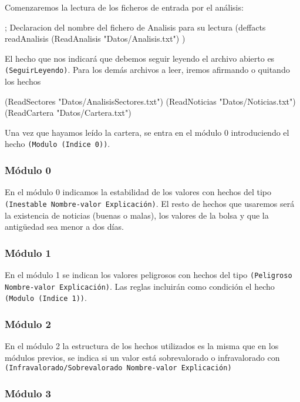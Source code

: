 \documentclass[11pt,leqno]{article}
\theoremstyle{definition_wo_parentheses}
\theoremstyle{plain}
\theoremstyle{remark}
\begin{document}
Comenzaremos la lectura de los ficheros de entrada por el análisis: 

\begin{clips-code}
; Declaracion del nombre del fichero de Analisis para su lectura
(deffacts readAnalisis
  (ReadAnalisis "Datos/Analisis.txt")
)
\end{clips-code}

El hecho que nos indicará que debemos seguir leyendo el archivo abierto es \texttt{(SeguirLeyendo)}. Para los demás archivos a leer, iremos afirmando o quitando los hechos

\begin{clips-code}
(ReadSectores "Datos/AnalisisSectores.txt")
(ReadNoticias "Datos/Noticias.txt")
(ReadCartera "Datos/Cartera.txt")
\end{clips-code}

Una vez que hayamos leído la cartera, se entra en el módulo 0 introduciendo el hecho \texttt{(Modulo (Indice 0))}.

\subsubsection{Módulo 0}

En el módulo 0 indicamos la estabilidad de los valores con hechos del tipo \texttt{(Inestable Nombre-valor Explicación)}. El resto  de hechos que usaremos será la existencia de noticias (buenas o malas), los valores de la bolsa y que la antigüedad sea menor a dos días. 

\subsubsection{Módulo 1}

En el módulo 1 se indican los valores peligrosos con hechos del tipo \texttt{(Peligroso Nombre-valor Explicación)}. Las reglas incluirán como condición el hecho \texttt{(Modulo (Indice 1))}.

\subsubsection{Módulo 2}

En el módulo 2 la estructura de los hechos utilizados es la misma que en los módulos previos, se indica si un valor está sobrevalorado o infravalorado con \texttt{(Infravalorado/Sobrevalorado Nombre-valor Explicación)}

\subsubsection{Módulo 3}
\end{document}
